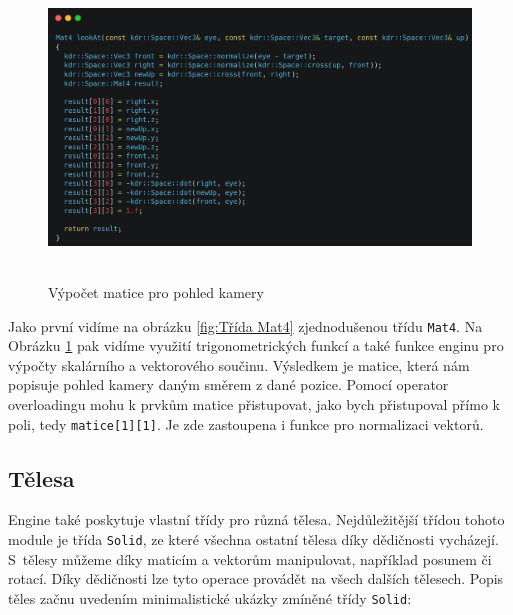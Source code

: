 \documentclass[12pt]{article}
\begin{document}
\begin{figure}[!h]
    \centering
    \includegraphics[height=8cm]{images/lookat_mat.png}
    \caption{Výpočet matice pro pohled kamery}
    \label{fig:Výpočet matice pro pohled kamery}
\end{figure}

\pagebreak

Jako první vidíme na obrázku \ref{fig:Třída Mat4} zjednodušenou třídu \texttt{Mat4}. Na Obrázku \ref{fig:Výpočet matice pro pohled kamery} pak vidíme využití trigonometrických funkcí a také funkce enginu pro výpočty skalárního a vektorového součinu. Výsledkem je matice, která nám popisuje pohled kamery daným směrem z dané pozice. Pomocí operator overloadingu mohu k prvkům matice přistupovat, jako bych přistupoval přímo k poli, tedy \texttt{matice[1][1]}. Je zde zastoupena i funkce pro normalizaci vektorů.

\subsection{Tělesa}

Engine také poskytuje vlastní třídy pro různá tělesa. Nejdůležitější třídou tohoto module je třída \texttt{Solid}, ze které všechna ostatní tělesa díky dědičnosti vycházejí. S~tělesy můžeme díky maticím a vektorům manipulovat, například posunem či rotací. Díky dědičnosti lze tyto operace provádět na všech dalších tělesech. Popis těles začnu uvedením minimalistické ukázky zmíněné třídy \texttt{Solid}:
\end{document}
